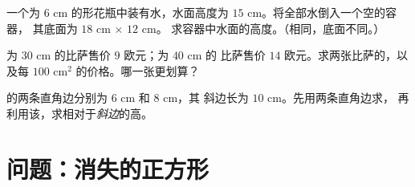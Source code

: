 \begin{exercise}[$\star\star$]\label{exo:g7:areas:10}
一个为 $6$ cm 的形花瓶中装有水，水面高度为
$15$ cm。将全部水倒入一个空的容器，
其底面为 $18$ cm $\times$ $12$ cm。
求容器中水面的高度。（相同，底面不同。）
\end{exercise}

\begin{exercise}[$\star\star$]\label{exo:g7:areas:11}
为 $30$ cm 的比萨售价 $9$ 欧元；为 $40$ cm 的
比萨售价 $14$ 欧元。求两张比萨的，以及每 $100$
cm$^2$ 的价格。哪一张更划算？
\end{exercise}

\begin{exercise}[$\star\star\star$]\label{exo:g7:areas:12}
的两条直角边分别为 $6$ cm 和 $8$ cm，其
斜边长为 $10$ cm。先用两条直角边求，
再利用该，求相对于\emph{斜边}的高。
\end{exercise}

\section{问题：消失的正方形}

